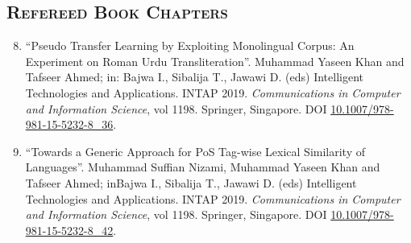 \documentclass[a4paper, 10pt]{article}
\begin{document}
\subsection*{\normalfont\textsc{Refereed Book Chapters}}
\begin{enumerate}
\setcounter{enumi}{7}
\itemsep-4pt 
 \item ``Pseudo Transfer Learning by Exploiting Monolingual Corpus: An Experiment on Roman Urdu Transliteration''. Muhammad Yaseen Khan and Tafseer Ahmed; in: Bajwa I., Sibalija T., Jawawi D. (eds) Intelligent Technologies and Applications. INTAP 2019. \emph{Communications in Computer and Information Science}, vol 1198. Springer, Singapore. DOI \href{https://doi.org/10.1007/978-981-15-5232-8_36}{10.1007/978-981-15-5232-8\_36}.
  
   \item ``Towards a Generic Approach for PoS Tag-wise Lexical Similarity of Languages''. Muhammad Suffian Nizami, Muhammad Yaseen Khan and Tafseer Ahmed; inBajwa I., Sibalija T., Jawawi D. (eds) Intelligent Technologies and Applications. INTAP 2019. \emph{Communications in Computer and Information Science}, vol 1198. Springer, Singapore. DOI \href{https://doi.org/10.1007/978-981-15-5232-8_42}{10.1007/978-981-15-5232-8\_42}.
   
 \end{enumerate}
\end{document}
